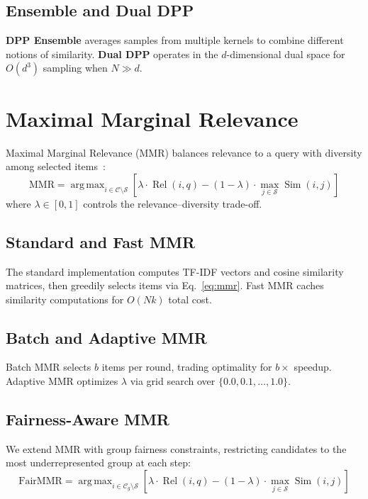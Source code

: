 \documentclass[11pt]{article}
\DeclareMathOperator*{\argmax}{arg\,max}
\DeclareMathOperator{\Sim}{Sim}
\DeclareMathOperator{\Rel}{Rel}
\begin{document}
\subsection{Ensemble and Dual DPP}

\textbf{DPP Ensemble} averages samples from multiple kernels to combine
different notions of similarity. \textbf{Dual DPP} operates in the
$d$-dimensional dual space for $O(d^3)$ sampling when $N \gg d$.

\section{Maximal Marginal Relevance}
\label{sec:mmr}

Maximal Marginal Relevance (MMR) balances relevance to a query with diversity
among selected items~\citep{carbonell1998mmr}:
\begin{equation}
\text{MMR} = \argmax_{i \in \mathcal{C} \setminus \mathcal{S}} \left[
  \lambda \cdot \Rel(i, q) - (1-\lambda) \cdot \max_{j \in \mathcal{S}} \Sim(i, j)
\right]
\label{eq:mmr}
\end{equation}
where $\lambda \in [0,1]$ controls the relevance--diversity trade-off.

\subsection{Standard and Fast MMR}

The standard implementation computes TF-IDF vectors and cosine similarity
matrices, then greedily selects items via Eq.~\eqref{eq:mmr}. Fast MMR
caches similarity computations for $O(Nk)$ total cost.

\subsection{Batch and Adaptive MMR}

Batch MMR selects $b$ items per round, trading optimality for $b\times$
speedup. Adaptive MMR optimizes $\lambda$ via grid search over
$\{0.0, 0.1, \ldots, 1.0\}$.

\subsection{Fairness-Aware MMR}

We extend MMR with group fairness constraints, restricting candidates to the
most underrepresented group at each step:
\begin{equation}
\text{FairMMR} = \argmax_{i \in \mathcal{C}_g \setminus \mathcal{S}} \left[
  \lambda \cdot \Rel(i, q) - (1-\lambda) \cdot \max_{j \in \mathcal{S}} \Sim(i, j)
\right]
\end{equation}
\end{document}
